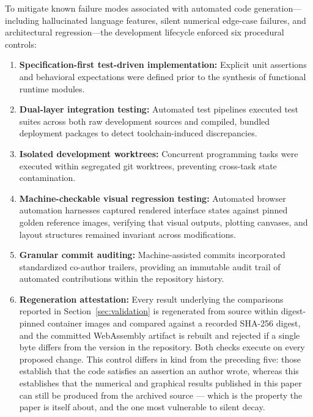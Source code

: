 \documentclass[11pt,a4paper]{article}
\begin{document}
To mitigate known failure modes associated with automated code generation—including hallucinated language features, silent numerical edge-case failures, and architectural regression—the development lifecycle enforced six procedural controls:
\begin{enumerate}
\item \textbf{Specification-first test-driven implementation:} Explicit unit assertions and behavioral expectations were defined prior to the synthesis of functional runtime modules.
\item \textbf{Dual-layer integration testing:} Automated test pipelines executed test suites across both raw development sources and compiled, bundled deployment packages to detect toolchain-induced discrepancies.
\item \textbf{Isolated development worktrees:} Concurrent programming tasks were executed within segregated git worktrees, preventing cross-task state contamination.
\item \textbf{Machine-checkable visual regression testing:} Automated browser automation harnesses captured rendered interface states against pinned golden reference images, verifying that visual outputs, plotting canvases, and layout structures remained invariant across modifications.
\item \textbf{Granular commit auditing:} Machine-assisted commits incorporated standardized co-author trailers, providing an immutable audit trail of automated contributions within the repository history.
\item \textbf{Regeneration attestation:} Every result underlying the comparisons reported in Section~\ref{sec:validation} is regenerated from source within digest-pinned container images and compared against a recorded SHA-256 digest, and the committed WebAssembly artifact is rebuilt and rejected if a single byte differs from the version in the repository. Both checks execute on every proposed change. This control differs in kind from the preceding five: those establish that the code satisfies an assertion an author wrote, whereas this establishes that the numerical and graphical results published in this paper can still be produced from the archived source --- which is the property the paper is itself about, and the one most vulnerable to silent decay.
\end{enumerate}
\end{document}
